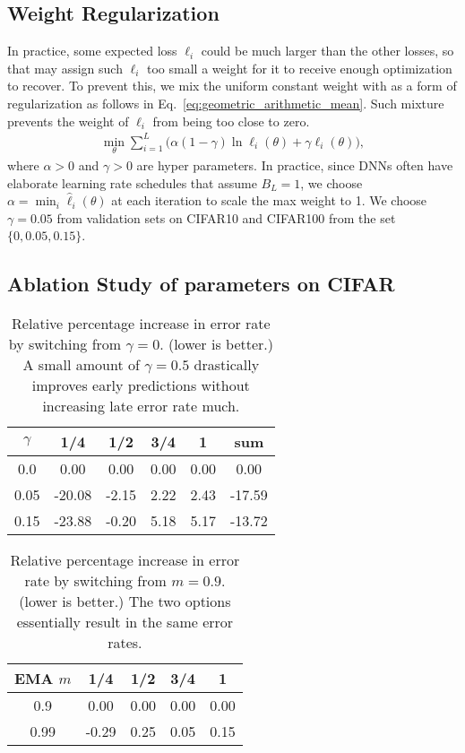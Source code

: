 \label{sec:implementation_adaloss}


\subsection{Weight Regularization} 
In practice, some expected loss $\ell_i$ could be much larger than the other losses, so that \adaloss may assign such $\ell_i$ too small a weight for it to receive enough optimization to recover. To prevent this, we mix the uniform constant weight with \adaloss as a form of regularization as follows in Eq.~\ref{eq:geometric_arithmetic_mean}. Such mixture prevents the weight of $\ell_i$ from being too close to zero. 
\begin{align}
    \min _{\theta} \sum _{i=1}^L \big( \alpha (1 - \gamma) \ln \ell _i (\theta) + \gamma  \ell_i (\theta) \big),
    \label{eq:geometric_arithmetic_mean}
\end{align}
where $\alpha >0$ and $\gamma >0$ are hyper parameters. In practice, since DNNs often have elaborate learning rate schedules that assume $B_L=1$, we choose $\alpha  = \min_i \hat{\ell}_i(\theta)$ at each iteration to scale the max weight to 1. We choose $\gamma = 0.05$ from validation sets on CIFAR10 and CIFAR100 from the set $\{0, 0.05, 0.15\}$.

\subsection{Ablation Study of \adaloss parameters on CIFAR} 


\begin{table}[t]
    \centering
    \begin{tabular}{c|cccc|c}
\hline
$\gamma$ & 1/4 & 1/2 & 3/4 & 1  & sum\\
\hline
0.0
	&  0.00 &  0.00 &  0.00 &  0.00  & 0.00\\
0.05
	& -20.08 & -2.15 &  2.22 &  2.43 & -17.59 \\
0.15
	& -23.88 & -0.20 &  5.18 &  5.17 & -13.72\\
\hline
    \end{tabular}
    \caption{Relative percentage increase in error rate by switching from $\gamma=0$. (lower is better.) A small amount of $\gamma = 0.5$ drastically improves early predictions without increasing late error rate much.}
    \label{tab:adaloss_gamma}
\end{table}


\begin{table}[t]
    \centering
    \begin{tabular}{c|cccc}
\hline
EMA $m$ & 1/4 & 1/2 & 3/4 & 1 \\
\hline
0.9
	&  0.00 &  0.00 &  0.00 &  0.00 \\
0.99
	& -0.29 &  0.25 &  0.05 &  0.15 \\
\hline
    \end{tabular}
    \caption{Relative percentage increase in error rate by switching from $m=0.9$.  (lower is better.) The two options essentially result in the same error rates.}
    \label{tab:adaloss_momentum}
\end{table}

